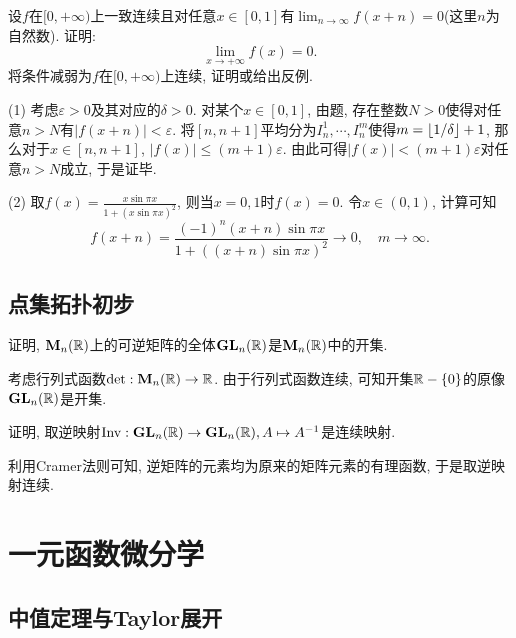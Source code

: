 \begin{exercise} \label{ex:于品p128_D4}
	设$f$在$[0,+\infty )$上一致连续且对任意$x \in [0,1]$有$\lim_{n \to \infty} f(x+n) = 0$(这里$n$为自然数). 证明: $$\lim_{x \to +\infty} f(x) = 0.$$
	将条件减弱为$f$在$[0,+\infty )$上连续, 证明或给出反例. 
\end{exercise}
\begin{solution}
	(1) 考虑$\varepsilon >0$及其对应的$\delta >0$. 对某个$x \in [0,1]$, 由题, 存在整数$N>0$使得对任意$n>N$有$|f(x+n)| < \varepsilon$. 将$[n,n+1]$平均分为$I_n^1,\cdots ,I_n^m$使得$m=\lfloor 1/\delta \rfloor+1$, 那么对于$x \in [n,n+1]$, $|f(x)| \leq (m+1)\varepsilon$. 由此可得$|f(x)|<(m+1)\varepsilon$对任意$n>N$成立, 于是证毕. 
	
	(2) 取$f(x) = \frac{x\sin \pi x}{1+(x\sin \pi x)^2}$, 则当$x=0,1$时$f(x)=0$. 令$x \in (0,1)$, 计算可知$$f(x+n) = \frac{(-1)^n(x+n)\sin \pi x}{1+((x+n)\sin \pi x)^2} \to 0,\quad m \to \infty .$$
\end{solution}


\section{点集拓扑初步}

\begin{exercise} \label{ex:于品p108_A11}
	证明, $\mathbf{M}_n(\mathbb{R})$上的可逆矩阵的全体$\mathbf{GL}_n(\mathbb{R})$是$\mathbf{M}_n(\mathbb{R})$中的开集. 
\end{exercise}
\begin{solution}
	考虑行列式函数$\det :\mathbf{M}_n(\mathbb{R}) \to \mathbb{R}$. 由于行列式函数连续, 可知开集$\mathbb{R} - \{ 0 \}$的原像$\mathbf{GL}_n(\mathbb{R})$是开集. 
\end{solution}

\begin{exercise} \label{ex:于品p108_A12}
	证明, 取逆映射${\rm Inv}:\mathbf{GL}_n(\mathbb{R}) \to \mathbf{GL}_n(\mathbb{R}),A \mapsto A^{-1}$是连续映射. 
\end{exercise}
\begin{solution}
	利用Cramer法则可知, 逆矩阵的元素均为原来的矩阵元素的有理函数, 于是取逆映射连续. 
\end{solution}







\chapter{一元函数微分学}


\section{中值定理与Taylor展开}

